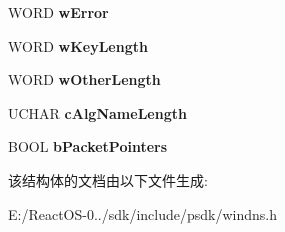 \begin{DoxyCompactItemize}
W\+O\+RD {\bfseries w\+Error}
\item 
\mbox{\label{struct_d_n_s___t_k_e_y___d_a_t_a_a_aa0b463d63d9eed33f4d0ad1ecc5300c2}} 
W\+O\+RD {\bfseries w\+Key\+Length}
\item 
\mbox{\label{struct_d_n_s___t_k_e_y___d_a_t_a_a_a6d6d79c7d5695e0da9f1db72cd13a61a}} 
W\+O\+RD {\bfseries w\+Other\+Length}
\item 
\mbox{\label{struct_d_n_s___t_k_e_y___d_a_t_a_a_a6b73042e79eda584dc1211e6f91938ea}} 
U\+C\+H\+AR {\bfseries c\+Alg\+Name\+Length}
\item 
\mbox{\label{struct_d_n_s___t_k_e_y___d_a_t_a_a_addcbfe8337c85bcd635ae0161877f153}} 
B\+O\+OL {\bfseries b\+Packet\+Pointers}
\end{DoxyCompactItemize}


该结构体的文档由以下文件生成\+:\begin{DoxyCompactItemize}
\item 
E\+:/\+React\+O\+S-\/0../sdk/include/psdk/windns.\+h\end{DoxyCompactItemize}
